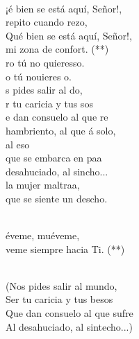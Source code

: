 \documentclass[12pt]{article}
\begin{document}
\begin{multicols*}{2}
\begin{cancion}%
	  \\
	¡é bien se está aquí, Señor!, \\
	repito cuando rezo,\\
	Qué bien se está aquí, Señor!,\\
	mi zona de confort. (**)\\
	ro tú no quieresso.\\
	o tú nouieres o.\\
	s pides salir al do,\\
	r tu caricia y tus sos\\
	e dan consuelo al que re\\
	 hambriento, al que á solo, \\
	al eso\\
	 que se embarca en paa\\
	 desahuciado, al sincho...\\
	la mujer maltraa,\\
	 que se siente un descho.\\\jump\\
	\begin{chorus}%
	éveme, muéveme,\\
	veme siempre hacia Ti. (**) \\
	\end{chorus}%
	\jump\\
(Nos pides salir al mundo,\\
 Ser tu caricia y tus besos\\
 Que dan consuelo al que sufre\\
 Al desahuciado, al sintecho...)\\
\end{cancion}%


\end{multicols*}
\end{document}
